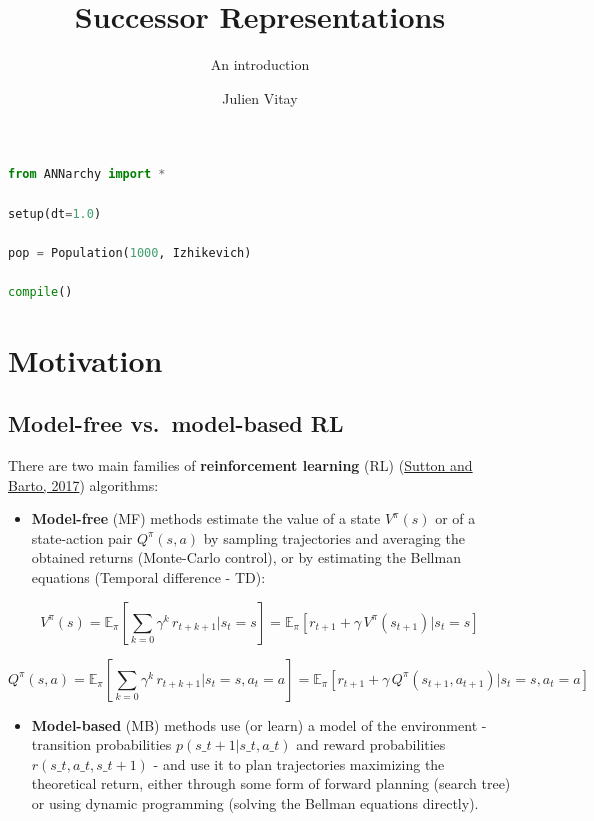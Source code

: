 \documentclass[
  11pt,
]{article}
\title{Successor Representations}
\subtitle{An introduction}
\author{Julien Vitay}
\date{}
\providecommand{\tightlist}{%
  \setlength{\itemsep}{0pt}\setlength{\parskip}{0pt}}
\begin{document}
\maketitle

{
\setcounter{tocdepth}{3}
\tableofcontents
}
\begin{lstlisting}[language=Python]
from ANNarchy import *

setup(dt=1.0)

pop = Population(1000, Izhikevich)

compile()
\end{lstlisting}

\hypertarget{motivation}{%
\section{Motivation}\label{motivation}}

\hypertarget{model-free-vs.-model-based-rl}{%
\subsection{Model-free vs.~model-based
RL}\label{model-free-vs.-model-based-rl}}

There are two main families of \textbf{reinforcement learning} (RL)
(\protect\hyperlink{ref-Sutton2017}{Sutton and Barto, 2017}) algorithms:

\begin{itemize}
\tightlist
\item
  \textbf{Model-free} (MF) methods estimate the value of a state
  \(V^\pi(s)\) or of a state-action pair \(Q^\pi(s, a)\) by sampling
  trajectories and averaging the obtained returns (Monte-Carlo control),
  or by estimating the Bellman equations (Temporal difference - TD):
\end{itemize}

\[V^\pi(s) = \mathbb{E}_{\pi} [\sum_{k=0} \gamma^k \, r_{t+k+1}  | s_t = s] = \mathbb{E}_{\pi} [r_{t+1} + \gamma \, V^\pi(s_{t+1})  | s_t = s]\]

\[Q^\pi(s, a) = \mathbb{E}_{\pi} [\sum_{k=0} \gamma^k \, r_{t+k+1}  | s_t = s, a_t = a] = \mathbb{E}_{\pi} [r_{t+1} + \gamma \, Q^\pi(s_{t+1}, a_{t+1})  | s_t = s, a_t = a]\]

\begin{itemize}
\tightlist
\item
  \textbf{Model-based} (MB) methods use (or learn) a model of the
  environment - transition probabilities \(p(s\_{t+1} | s\_t, a\_t)\)
  and reward probabilities \(r(s\_t, a\_t, s\_{t+1})\) - and use it to
  plan trajectories maximizing the theoretical return, either through
  some form of forward planning (search tree) or using dynamic
  programming (solving the Bellman equations directly).
\end{itemize}
\end{document}
